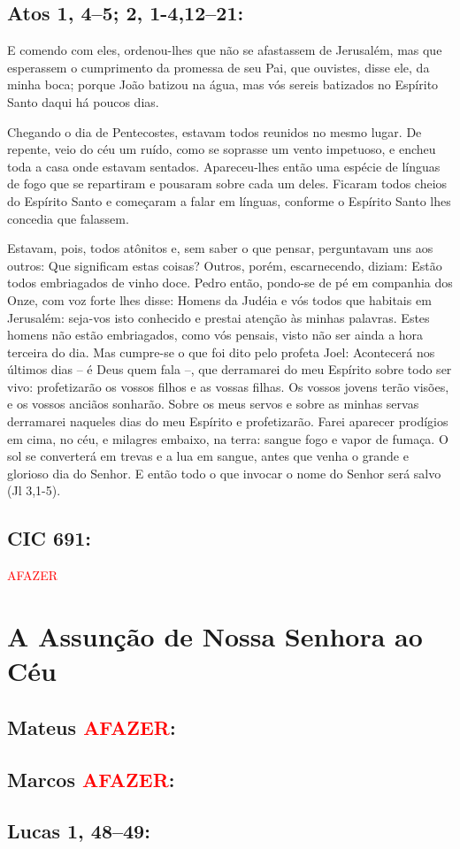 \documentclass[10pt,a5paper]{book}
\newcommand{\from}[1]{\subsection*{#1}}
\newcommand{\TODO}{\textcolor{red}{\ttfamily AFAZER}}
\begin{document}
\from{Atos 1, 4--5; 2, 1-4,12--21:}

E comendo com eles, ordenou-lhes que não se afastassem de Jerusalém, mas que esperassem o cumprimento da promessa de seu Pai, que ouvistes, disse ele, da minha boca;
porque João batizou na água, mas vós sereis batizados no Espírito Santo daqui há poucos dias.

Chegando o dia de Pentecostes, estavam todos reunidos no mesmo lugar.
De repente, veio do céu um ruído, como se soprasse um vento impetuoso, e encheu toda a casa onde estavam sentados.
Apareceu-lhes então uma espécie de línguas de fogo que se repartiram e pousaram sobre cada um deles.
Ficaram todos cheios do Espírito Santo e começaram a falar em línguas, conforme o Espírito Santo lhes concedia que falassem.

Estavam, pois, todos atônitos e, sem saber o que pensar, perguntavam uns aos outros: Que significam estas coisas?
Outros, porém, escarnecendo, diziam: Estão todos embriagados de vinho doce.
Pedro então, pondo-se de pé em companhia dos Onze, com voz forte lhes disse: Homens da Judéia e vós todos que habitais em Jerusalém: seja-vos isto conhecido e prestai atenção às minhas palavras.
Estes homens não estão embriagados, como vós pensais, visto não ser ainda a hora terceira do dia.
Mas cumpre-se o que foi dito pelo profeta Joel:
Acontecerá nos últimos dias -- é Deus quem fala --, que derramarei do meu Espírito sobre todo ser vivo: profetizarão os vossos filhos e as vossas filhas. Os vossos jovens terão visões, e os vossos anciãos sonharão.
Sobre os meus servos e sobre as minhas servas derramarei naqueles dias do meu Espírito e profetizarão.
Farei aparecer prodígios em cima, no céu, e milagres embaixo, na terra: sangue fogo e vapor de fumaça.
O sol se converterá em trevas e a lua em sangue, antes que venha o grande e glorioso dia do Senhor.
E então todo o que invocar o nome do Senhor será salvo (Jl 3,1-5).

\from{CIC 691:}

\TODO


\section{A Assunção de Nossa Senhora ao Céu}

\from{Mateus \TODO:}

\from{Marcos \TODO:}

\from{Lucas 1, 48--49:}
\end{document}
